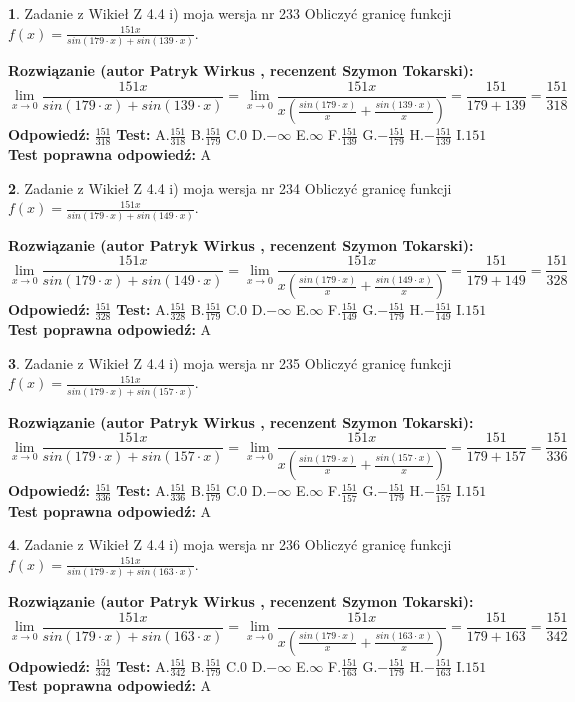 \documentclass[12pt, a4paper]{article}
\theoremstyle{definition} %
\newtheorem{zad}{}
\newcommand{\zadStart}[1]{\begin{zad}#1\newline}
\newcommand{\zadStop}{\end{zad}}
\newcommand{\rozwStart}[2]{\noindent \textbf{Rozwiązanie (autor #1 , recenzent #2): }\newline}
\newcommand{\rozwStop}{\newline}
\newcommand{\odpStart}{\noindent \textbf{Odpowiedź:}\newline}
\newcommand{\odpStop}{\newline}
\newcommand{\testStart}{\noindent \textbf{Test:}\newline}
\newcommand{\testStop}{\newline}
\newcommand{\kluczStart}{\noindent \textbf{Test poprawna odpowiedź:}\newline}
\newcommand{\kluczStop}{\newline}
\begin{document}
\zadStart{Zadanie z Wikieł Z 4.4 i) moja wersja nr 233}
Obliczyć granicę funkcji $f(x)=\frac{151x}{sin(179\cdot x) +sin(139\cdot x)}$.
\zadStop
\rozwStart{Patryk Wirkus}{Szymon Tokarski}
$$\lim\limits_{x\to 0}\frac{151x}{sin(179\cdot x) +sin(139\cdot x)}=\lim\limits_{x\to 0}\frac{151x}{x(\frac{sin(179\cdot x)}{x}+\frac{sin(139\cdot x)}{x})}=\frac{151}{179+139} = \frac{151}{318}$$
\rozwStop
\odpStart
$\frac{151}{318}$
\odpStop
\testStart
A.$\frac{151}{318}$
B.$\frac{151}{179}$
C.$0$
D.$-\infty$
E.$\infty$
F.$\frac{151}{139}$
G.$-\frac{151}{179}$
H.$-\frac{151}{139}$
I.$151$
\testStop
\kluczStart
A
\kluczStop



\zadStart{Zadanie z Wikieł Z 4.4 i) moja wersja nr 234}
Obliczyć granicę funkcji $f(x)=\frac{151x}{sin(179\cdot x) +sin(149\cdot x)}$.
\zadStop
\rozwStart{Patryk Wirkus}{Szymon Tokarski}
$$\lim\limits_{x\to 0}\frac{151x}{sin(179\cdot x) +sin(149\cdot x)}=\lim\limits_{x\to 0}\frac{151x}{x(\frac{sin(179\cdot x)}{x}+\frac{sin(149\cdot x)}{x})}=\frac{151}{179+149} = \frac{151}{328}$$
\rozwStop
\odpStart
$\frac{151}{328}$
\odpStop
\testStart
A.$\frac{151}{328}$
B.$\frac{151}{179}$
C.$0$
D.$-\infty$
E.$\infty$
F.$\frac{151}{149}$
G.$-\frac{151}{179}$
H.$-\frac{151}{149}$
I.$151$
\testStop
\kluczStart
A
\kluczStop



\zadStart{Zadanie z Wikieł Z 4.4 i) moja wersja nr 235}
Obliczyć granicę funkcji $f(x)=\frac{151x}{sin(179\cdot x) +sin(157\cdot x)}$.
\zadStop
\rozwStart{Patryk Wirkus}{Szymon Tokarski}
$$\lim\limits_{x\to 0}\frac{151x}{sin(179\cdot x) +sin(157\cdot x)}=\lim\limits_{x\to 0}\frac{151x}{x(\frac{sin(179\cdot x)}{x}+\frac{sin(157\cdot x)}{x})}=\frac{151}{179+157} = \frac{151}{336}$$
\rozwStop
\odpStart
$\frac{151}{336}$
\odpStop
\testStart
A.$\frac{151}{336}$
B.$\frac{151}{179}$
C.$0$
D.$-\infty$
E.$\infty$
F.$\frac{151}{157}$
G.$-\frac{151}{179}$
H.$-\frac{151}{157}$
I.$151$
\testStop
\kluczStart
A
\kluczStop



\zadStart{Zadanie z Wikieł Z 4.4 i) moja wersja nr 236}
Obliczyć granicę funkcji $f(x)=\frac{151x}{sin(179\cdot x) +sin(163\cdot x)}$.
\zadStop
\rozwStart{Patryk Wirkus}{Szymon Tokarski}
$$\lim\limits_{x\to 0}\frac{151x}{sin(179\cdot x) +sin(163\cdot x)}=\lim\limits_{x\to 0}\frac{151x}{x(\frac{sin(179\cdot x)}{x}+\frac{sin(163\cdot x)}{x})}=\frac{151}{179+163} = \frac{151}{342}$$
\rozwStop
\odpStart
$\frac{151}{342}$
\odpStop
\testStart
A.$\frac{151}{342}$
B.$\frac{151}{179}$
C.$0$
D.$-\infty$
E.$\infty$
F.$\frac{151}{163}$
G.$-\frac{151}{179}$
H.$-\frac{151}{163}$
I.$151$
\testStop
\kluczStart
A
\kluczStop
\end{document}
